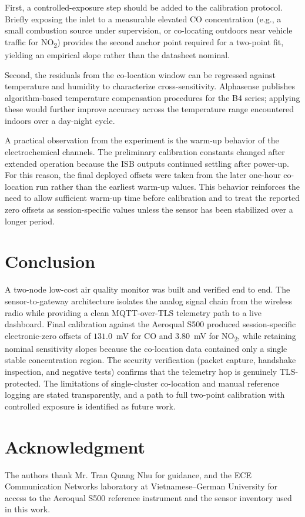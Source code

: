 \documentclass[conference]{IEEEtran}
\begin{document}
First, a controlled-exposure step should be added to the calibration protocol. Briefly exposing the inlet to a measurable elevated CO concentration (e.g., a small combustion source under supervision, or co-locating outdoors near vehicle traffic for NO\textsubscript{2}) provides the second anchor point required for a two-point fit, yielding an empirical slope rather than the datasheet nominal.

Second, the residuals from the co-location window can be regressed against temperature and humidity to characterize cross-sensitivity. Alphasense publishes algorithm-based temperature compensation procedures for the B4 series; applying these would further improve accuracy across the temperature range encountered indoors over a day-night cycle.

A practical observation from the experiment is the warm-up behavior of the electrochemical channels. The preliminary calibration constants changed after extended operation because the ISB outputs continued settling after power-up. For this reason, the final deployed offsets were taken from the later one-hour co-location run rather than the earliest warm-up values. This behavior reinforces the need to allow sufficient warm-up time before calibration and to treat the reported zero offsets as session-specific values unless the sensor has been stabilized over a longer period.

\section{Conclusion}

A two-node low-cost air quality monitor was built and verified end to end. The sensor-to-gateway architecture isolates the analog signal chain from the wireless radio while providing a clean MQTT-over-TLS telemetry path to a live dashboard. Final calibration against the Aeroqual S500 produced session-specific electronic-zero offsets of $131.0$~mV for CO and $3.80$~mV for NO\textsubscript{2}, while retaining nominal sensitivity slopes because the co-location data contained only a single stable concentration region. The security verification (packet capture, handshake inspection, and negative tests) confirms that the telemetry hop is genuinely TLS-protected. The limitations of single-cluster co-location and manual reference logging are stated transparently, and a path to full two-point calibration with controlled exposure is identified as future work.


\section*{Acknowledgment}
The authors thank Mr. Tran Quang Nhu for guidance, and the ECE Communication Networks laboratory at Vietnamese--German University for access to the Aeroqual S500 reference instrument and the sensor inventory used in this work.
\end{document}
